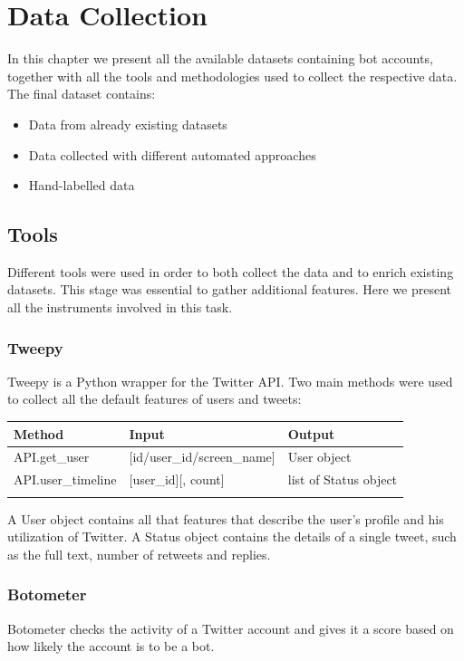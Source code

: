 
\chapter{Data Collection}
\label{capitolo3}
\thispagestyle{empty}


In this chapter we present all the available datasets containing bot accounts, together with all the tools and methodologies used to collect the respective data. The final dataset contains:

\begin{itemize}
\item[\PencilRight]Data from already existing datasets
\item[\PencilRight]Data collected with different automated approaches
\item[\PencilRight]Hand-labelled data
\end{itemize}

\section{Tools}
Different tools were used in order to both collect the data and to enrich existing datasets. This stage was essential to gather additional features. Here we present all the instruments involved in this task.

\subsection{Tweepy}
Tweepy is a Python wrapper for the Twitter API.
Two main methods were used to collect all the default features of users and tweets:\\


\begin{tabular}{lll}
\centering	
	Method&Input&Output\\ \hline\hline
	API.get\_user&[id/user\_id/screen\_name]&User object\\
	API.user\_timeline&[user\_id][, count]&list of Status object\\ \hline\\
\end{tabular}

A User object contains all that features that describe the user's profile and his utilization of Twitter.
A Status object contains the details of a single tweet, such as the full text, number of retweets and replies.

\subsection{Botometer}
Botometer \cite{Botometer} checks the activity of a Twitter account and gives it a score based on how likely the account is to be a bot.

